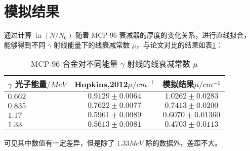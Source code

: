 \section{模拟结果}

通过计算 $\ln(N/N_0)$ 随着 MCP-96 衰减器的厚度的变化关系，进行直线拟合，能够得到不同 $\gamma$ 射线能量下的线衰减常数 $\mu$，与论文\cite{hopkins_linear_2012}对比的结果如表\ref{tab:atten}：

\onecolumn
\begin{table}
    \centering
    \caption{MCP-96 合金对不同能量 $\gamma$ 射线的线衰减常数 $\mu$}
    \label{tab:atten}
    \begin{tabular}{l|c|c}
    \toprule
    $\gamma$ 光子能量$/\si{MeV}$ & Hopkins,2012$\mu/\si{cm^{-1}}$ & 模拟结果$\mu/\si{cm^{-1}}$ \\ 
    \hline
    $0.662$ & $0.9129\pm0.0064$ & $1.0262\pm0.0283$ \\
    \hline
    $0.835$ & $0.7622\pm0.0077$ & $0.7413\pm0.0200$ \\
    \hline
    $1.17$ & $0.5961\pm0.0089$ & $0.6070\pm0.01360$ \\
    \hline
    $1.33$ & $0.5613\pm0.0081$ & $0.4703\pm0.0113$ \\
    \bottomrule
    \end{tabular}
\end{table}

可见其中数值有一定差异，但是除了 $1.33\si{MeV}$ 除的数据外，差距不大。

\twocolumn

\begin{figure}[!htb]
  \centering
  \resizebox{\linewidth}{!}{}
  \caption{}
\end{figure}

\begin{figure}[!htb]
  \centering
  \resizebox{\linewidth}{!}{}
  \caption{}
\end{figure}